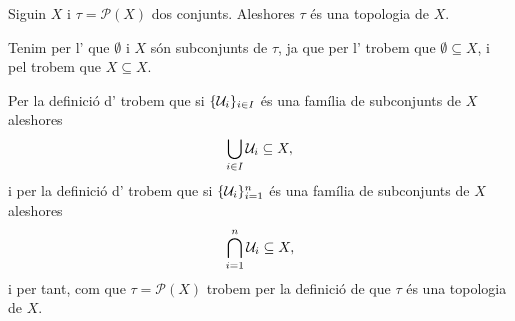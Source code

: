 \documentclass[../Apunts.tex]{subfiles}
\begin{document}
	\begin{example}
		\label{ex:topologia discreta}
		Siguin \(X\) i \(\tau=\mathcal{P}(X)\) dos conjunts. Aleshores \(\tau\) és una topologia de \(X\).
		\begin{solution}
			Tenim per l' que \(\emptyset\) i \(X\) són subconjunts de \(\tau\), ja que per l' trobem que \(\emptyset\subseteq X\), i pel  trobem que \(X\subseteq X\).
			
			Per la definició d' trobem que si \(\{\mathcal{U}_{i}\}_{i\in I}\) és una família de subconjunts de \(X\) aleshores
			\[\bigcup_{i\in I}\mathcal{U}_{i}\subseteq X,\]
			i per la definició d' trobem que si \(\{\mathcal{U}_{i}\}_{i=1}^{n}\) és una família de subconjunts de \(X\) aleshores
			\[\bigcap_{i=1}^{n}\mathcal{U}_{i}\subseteq X,\]
			i per tant, com que \(\tau=\mathcal{P}(X)\) trobem per la definició de  que \(\tau\) és una topologia de \(X\).
		\end{solution}
	\end{example}
\end{document}
